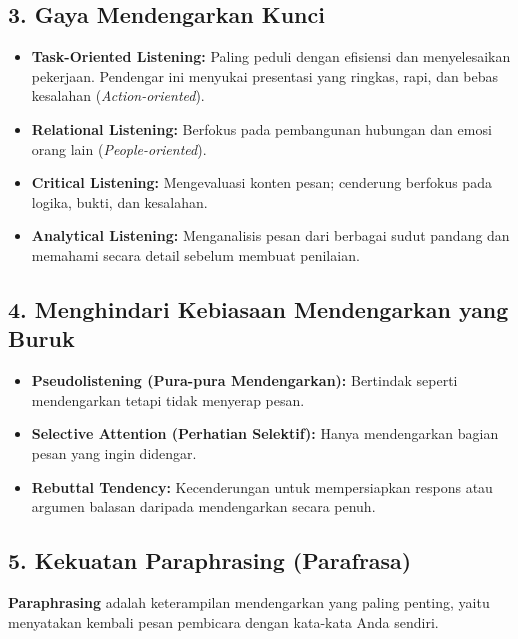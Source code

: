 \documentclass[
  letterpaper,
  DIV=11,
  numbers=noendperiod]{scrreprt}
\providecommand{\tightlist}{%
  \setlength{\itemsep}{0pt}\setlength{\parskip}{0pt}}
\begin{document}
\subsection{3. Gaya Mendengarkan Kunci}\label{gaya-mendengarkan-kunci}

\begin{itemize}
\tightlist
\item
  \textbf{Task-Oriented Listening:} Paling peduli dengan efisiensi dan
  menyelesaikan pekerjaan. Pendengar ini menyukai presentasi yang
  ringkas, rapi, dan bebas kesalahan (\emph{Action-oriented}).
\item
  \textbf{Relational Listening:} Berfokus pada pembangunan hubungan dan
  emosi orang lain (\emph{People-oriented}).
\item
  \textbf{Critical Listening:} Mengevaluasi konten pesan; cenderung
  berfokus pada logika, bukti, dan kesalahan.
\item
  \textbf{Analytical Listening:} Menganalisis pesan dari berbagai sudut
  pandang dan memahami secara detail sebelum membuat penilaian.
\end{itemize}

\subsection{4. Menghindari Kebiasaan Mendengarkan yang
Buruk}\label{menghindari-kebiasaan-mendengarkan-yang-buruk}

\begin{itemize}
\tightlist
\item
  \textbf{Pseudolistening (Pura-pura Mendengarkan):} Bertindak seperti
  mendengarkan tetapi tidak menyerap pesan.
\item
  \textbf{Selective Attention (Perhatian Selektif):} Hanya mendengarkan
  bagian pesan yang ingin didengar.
\item
  \textbf{Rebuttal Tendency:} Kecenderungan untuk mempersiapkan respons
  atau argumen balasan daripada mendengarkan secara penuh.
\end{itemize}

\subsection{5. Kekuatan Paraphrasing
(Parafrasa)}\label{kekuatan-paraphrasing-parafrasa}

\textbf{Paraphrasing} adalah keterampilan mendengarkan yang paling
penting, yaitu menyatakan kembali pesan pembicara dengan kata-kata Anda
sendiri.
\end{document}
